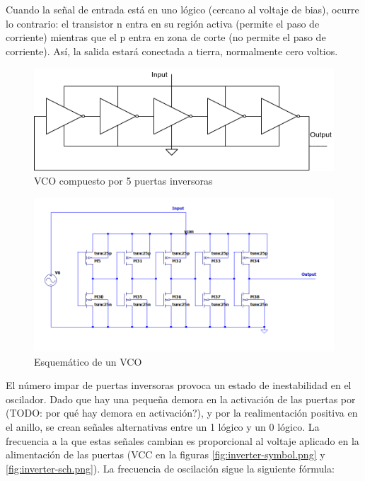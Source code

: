 \documentclass[12pt]{report} %
\begin{document}
	Cuando la señal de entrada está en uno lógico (cercano al voltaje de bias), ocurre lo contrario: el transistor n entra en su región activa (permite el paso de corriente) mientras que el p entra en zona de corte (no permite el paso de corriente). Así, la salida estará conectada a tierra, normalmente cero voltios.

	\begin{figure}[H]
		\includegraphics[width=\textwidth]{vco-symbol.png}
		\caption[VCO compuesto por 5 puertas inversoras]{VCO compuesto por 5 puertas inversoras}
		\label{fig:vco-symbol.png}
	\end{figure}

	\begin{figure}[H]
		\includegraphics[width=\textwidth]{vco-sch.png}
		\caption[Esquemático de un VCO]{Esquemático de un VCO}
		\label{fig:vco-sch.png}
	\end{figure}

	El número impar de puertas inversoras provoca un estado de inestabilidad en el oscilador. Dado que hay una pequeña demora en la activación de las puertas por (TODO: por qué hay demora en activación?), y por la realimentación positiva en el anillo, se crean señales alternativas entre un 1 lógico y un 0 lógico. La frecuencia a la que estas señales cambian es proporcional al voltaje aplicado en la alimentación de las puertas (VCC en la figuras \ref{fig:inverter-symbol.png} y \ref{fig:inverter-sch.png}). La frecuencia de oscilación sigue la siguiente fórmula:
	
\end{document}
